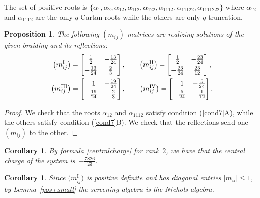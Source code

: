 \documentclass[pdftex]{sigma}%
\numberwithin{equation}{section}
\newtheorem{cor}[teo]{Corollary}
\newtheorem{prop}[teo]{Proposition}
\begin{document}
The set of positive roots is $\lbrace \alpha_1, \alpha_2, \alpha_{12}, \alpha_{112}, \alpha_{122}, \alpha_{1112}, \alpha_{11122}, \alpha_{1111222}\rbrace$ where $\alpha_{12}$ and $\alpha_{1112}$ are the only $q$-Cartan roots while the others are only $q$-truncation.
\begin{prop}
The following $(m_{ij})$ matrices are realizing solutions of the given braiding and its reflections:
\begin{gather*}
\big(m_{ij}^{\mathrm{I}}\big)=  \begin{bmatrix}
 \frac{1}{2} & -\frac{13}{24}\vspace{1mm}\\
 -\frac{13}{24} & \frac{2}{3}
\end{bmatrix}, \qquad
\big(m_{ij}^{\mathrm{II}}\big)= \begin{bmatrix}
 \frac{1}{2} & -\frac{23}{24}\vspace{1mm}\\
 -\frac{23}{24} & \frac{23}{12}
\end{bmatrix}, \\
\big(m_{ij}^{\mathrm{III}}\big)=  \begin{bmatrix}
 \hphantom{-}1 & -\frac{19}{24}\vspace{1mm}\\
 -\frac{19}{24} & \hphantom{-}\frac{2}{3}
\end{bmatrix}, \qquad
\big(m_{ij}^{\mathrm{IV}}\big)= \begin{bmatrix}
 \hphantom{-}1 & -\frac{5}{24}\vspace{1mm}\\
 -\frac{5}{24} & \hphantom{-}\frac{1}{12}
\end{bmatrix}.
\end{gather*}
\end{prop}
\begin{proof}
We check that the roots $\alpha_{12}$ and $\alpha_{1112}$ satisfy condition (\ref{cond7}A), while the others satisfy condition (\ref{cond7}B).
We check that the reflections send one $(m_{ij})$ to the other.
\end{proof}
\begin{cor}
By formula \eqref{centralcharge} for rank~$2$, we have that the central charge of the system is~$-\frac{7826}{23}$.
\end{cor}

\begin{cor}Since $\big(m_{ij}^{\mathrm{I}}\big)$ is positive definite and has diagonal entries $|m_{ii}|\leq 1$, by Lem\-ma~{\rm \ref{pos+small}} the screening algebra is the Nichols algebra.
\end{cor}
\end{document}
